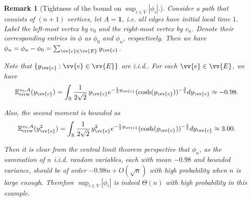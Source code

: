\documentclass[a4paper, 11pt]{article}
\renewcommand{\P}{\mathbb{P}}
\newcommand{\E}{\mathbb{E}}
\newcommand{\Eerrw}{\E_{\textnormal{errw}}}
\newcommand{\Perrw}{\P_{\textnormal{errw}}}
\newtheorem{rem}{Remark}[thm]
\begin{document}
\vspace{.3em}
\begin{rem}[Tightness of the bound on $\sup_{i\in V}|\phi_i|$.]
\label{rem:tight_fluc}
Consider a path that consists of $(n+1)$ vertices, let $A = \mathbf{1}$,
i.e. all edges have initial local time $1$.
Label the left-most vertex by $v_0$ and the right-most vertex by $v_n$. Denote their corresponding entries in $\phi$ as $\phi_0$ and $\phi_n$, respectively. Then we have $\phi_n=\phi_n-\phi_0=\sum_{\vv{e}\in\vv{E}}y_{\vv{e}}$. 

Note that $\{y_{\vv{e}}: \vv{e}\in \vv{E}\}$ are i.i.d.. For each $\vv{e}\in\vv{E}$, we have
\[\Eerrw^{v_0,A}(y_{\vv{e}}) = \int_{\mathbb{R}}\frac{1}{2\sqrt{2}} \,y_{\vv{e}} e^{-\frac{1}{2}y_{\vv{e}}} (\cosh(y_{\vv{e}}))^{-\frac{3}{2}} dy_{\vv{e}}\approx -0.98.\]

Also, the second moment is bounded as
\[\Eerrw^{v_0,A}(y_{\vv{e}}^2) = \int_{\mathbb{R}}\frac{1}{2\sqrt{2}} \,y_{\vv{e}}^2 e^{-\frac{1}{2}y_{\vv{e}}} (\cosh(y_{\vv{e}}))^{-\frac{3}{2}} dy_{\vv{e}}\approx 3.00.\]

Then it is clear from the central limit theorem perspective that $\phi_n$, as the summation of $n$ i.i.d. random variables, each with mean $-0.98$ and bounded variance, should be of order $-0.98n+O(\sqrt{n})$ with high probability when $n$ is large enough. Therefore $\sup_{i\in V}|\phi_i|$ is indeed $\Theta(n)$ with high probability in this example.
\end{rem}

\end{document}

